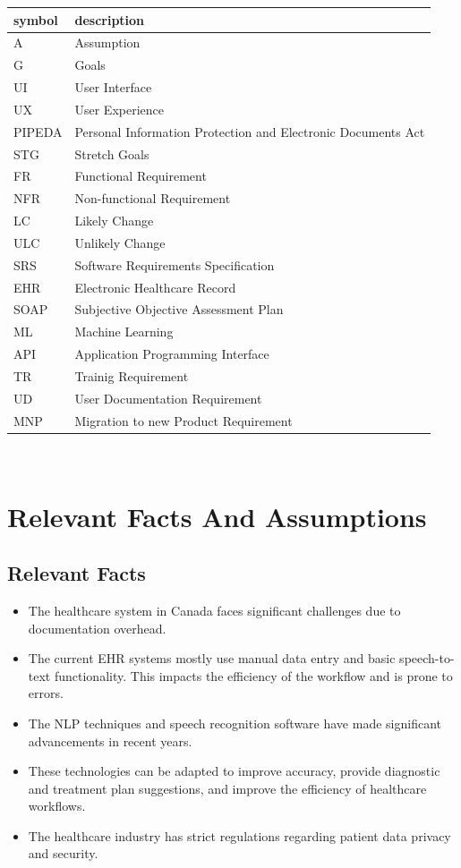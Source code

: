 \documentclass[12pt]{article}
\begin{document}
\begin{tabular}{l l} 
  \toprule    
  \textbf{symbol} & \textbf{description}\\
  \midrule 
  A & Assumption\\
  G & Goals\\
  UI & User Interface\\
  UX & User Experience\\
  PIPEDA & Personal Information Protection and Electronic Documents Act\\
  STG & Stretch Goals\\
  FR & Functional Requirement\\
  NFR & Non-functional Requirement\\
  LC & Likely Change\\
  ULC & Unlikely Change\\
  SRS & Software Requirements Specification\\
  EHR & Electronic Healthcare Record\\
  SOAP & Subjective Objective Assessment Plan \\
  ML & Machine Learning \\
  API & Application Programming Interface \\
  TR & Trainig Requirement \\
  UD & User Documentation Requirement \\
  MNP & Migration to new Product Requirement \\
  \bottomrule
\end{tabular}\\

\section{Relevant Facts And Assumptions}

\subsection{Relevant Facts}
\begin{itemize}
  \item The healthcare system in Canada faces significant challenges due to documentation overhead.
  
  \item The current EHR systems mostly use manual data entry and basic speech-to-text functionality. This impacts the efficiency of the workflow and is prone to errors.
  
  \item The NLP techniques and speech recognition software have made significant advancements in recent years. 
  
  \item These technologies can be adapted to improve accuracy, provide diagnostic and treatment plan suggestions, and improve the efficiency of healthcare workflows. 
  
  \item The healthcare industry has strict regulations regarding patient data privacy and security.
\end{itemize}
\end{document}
